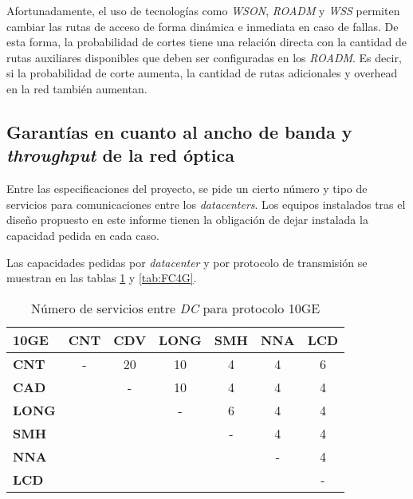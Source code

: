 Afortunadamente, el uso de tecnologías como \emph{WSON}, \emph{ROADM}
y \emph{WSS} permiten cambiar las rutas de acceso de forma dinámica e
inmediata en caso de fallas. De esta forma, la probabilidad de cortes
tiene una relación directa con la cantidad de rutas auxiliares disponibles
que deben ser configuradas en los \emph{ROADM}. Es decir, si la
probabilidad de corte aumenta, la cantidad de rutas adicionales y
overhead en la red también aumentan.

\subsection{Garantías en cuanto al ancho de banda y \emph{throughput}
  de la red óptica}
\label{sec:anchodebanda}

Entre las especificaciones del proyecto, se pide un cierto número y
tipo de servicios para comunicaciones entre los \emph{datacenters}. Los
equipos instalados tras el diseño propuesto en este informe tienen la
obligación de dejar instalada la capacidad pedida en cada caso.

Las capacidades pedidas por \emph{datacenter} y por protocolo de
transmisión se muestran en las tablas \ref{tab:10ge} y \ref{tab:FC4G}.

\begin{table}[H]
  \centering
  \begin{tabular}{| l | c | c | c | c | c | c |}
    \hline
    \textbf{10GE} & \textbf{CNT} & \textbf{CDV} & \textbf{LONG} & \textbf{SMH} & \textbf{NNA} & \textbf{LCD} \\
    \hline
    \textbf{CNT}  & - & 20 & 10 & 4 & 4 & 6 \\
    \hline
    \textbf{CAD}  &   & - & 10 & 4 & 4 & 4 \\
    \hline
    \textbf{LONG} &   &   & - & 6 & 4 & 4 \\
    \hline
    \textbf{SMH}  &   &   &   & - & 4 & 4 \\
    \hline
    \textbf{NNA}  &   &   &   &   & - & 4 \\
    \hline
    \textbf{LCD}  &   &   &   &   &   & - \\
    \hline
  \end{tabular}
  \caption{Número de servicios entre \emph{DC} para protocolo 10GE}
  \label{tab:10ge}
\end{table}

